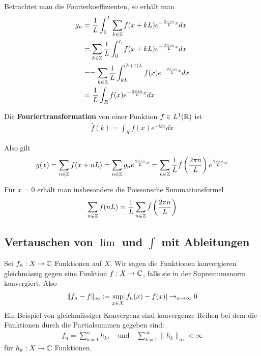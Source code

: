 Betrachtet man die Fourierkoeffizienten, so erhält man
\begin{align*}
	g_n &= \frac{1}{L }\int_{0}^{L} \sum_{k \in \mathbb{Z}} f(x + kL) e^{- \frac{2\pi in }{L}x}dx \\
			&= \sum_{k \in \mathbb{Z}} \frac{1}{L} \int_{0}^{L}f(x + kL) e^{- \frac{2\pi in}{L}x}dx\\
			&= = \sum_{k \in \mathbb{Z}} \frac{1}{L} \int_{kL}^{(k+1)L}f(x) e^{- \frac{2 \pi in}{L}x}dx\\
			&= \frac{1}{L} \int_R f(x) e^{- \frac{2\pi i n}{L}x}dx
\end{align*}


\begin{definition}
	Die \textbf{Fouriertransformation}  von einer Funktion $f \in L^1(\mathbb{R})$ ist 
	\begin{align*}
		\hat{f}(k) = \int_R f(x) e^{-ikx}dx
	\end{align*}
\end{definition}

Also gilt
\begin{align*}
	g(x) = \sum_{n \in \mathbb{Z}} f(x + nL) = \sum_{n \in \mathbb{Z}} g_n e^{\frac{2\pi in}{L}x} = \sum_{n \in \mathbb{Z}} \frac{1}{L} \hat{f} \left(\frac{2 \pi n}{L}\right) e^{\frac{2\pi in}{L}x} 
\end{align*}

Für $x = 0$ erhält man insbesondere die Poissonsche Summationsformel
\begin{align*}
	\sum_{n \in \mathbb{Z}} f(nL) = \frac{1}{L} \sum_{n \in \mathbb{Z}} \hat{f} \left(\frac{2\pi n}{L}\right)
\end{align*}


\subsection{Vertauschen von $\lim$ und $\int$ mit Ableitungen}
Sei $f_n: X \to \mathbb{C}$ Funktionen auf $X$. Wir sagen die Funktionen konvergieren gleichmässig gegen eine Funktion $f:X \to \mathbb{C}$, falls sie in der Supremumsnorm konvergiert. Also
\begin{align*}
	\|f_n - f\|_{\infty} := \sup_{x \in X} \abs{f_n(x) - f(x)} \to_{n \to \infty} 0
\end{align*}
Ein Beispiel von gleichmässiger Konvergenz sind konvergenze Reihen bei dem die Funktionen durch die Partialsummen gegeben sind:
\begin{align*}
	f_n = \sum_{k=1}^{n} h_k, \quad \text{und} \quad \sum_{k=1}^{\infty}\|h_k\|_{\infty} < \infty
\end{align*}
für $h_k: X \to \mathbb{C}$ Funktionen. 

